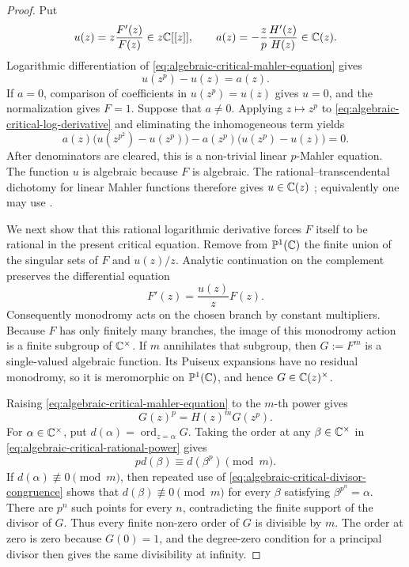 \begin{proof}
Put
\[
 u(z)=z\frac{F'(z)}{F(z)}\in z\mathbb{C}[[z]],
 \qquad
 a(z)=-\frac{z}{p}\frac{H'(z)}{H(z)}\in\mathbb{C}(z).
\]
Logarithmic differentiation of
\eqref{eq:algebraic-critical-mahler-equation} gives
\begin{equation}\label{eq:algebraic-critical-log-derivative}
 u(z^p)-u(z)=a(z).
\end{equation}
If \(a=0\), comparison of coefficients in \(u(z^p)=u(z)\) gives \(u=0\),
and the normalization gives \(F=1\).  Suppose that \(a\ne0\).  Applying
\(z\mapsto z^p\) to
\eqref{eq:algebraic-critical-log-derivative} and eliminating the
inhomogeneous term yields
\begin{equation}\label{eq:algebraic-critical-linear-mahler-equation}
 a(z)\bigl(u(z^{p^2})-u(z^p)\bigr)
 -a(z^p)\bigl(u(z^p)-u(z)\bigr)=0.
\end{equation}
After denominators are cleared, this is a non-trivial linear \(p\)-Mahler
equation.  The function \(u\) is algebraic because \(F\) is algebraic.
The rational--transcendental dichotomy for linear Mahler functions therefore
gives \(u\in\mathbb{C}(z)\)
\cite[Theorem~5.1.7]{Nishioka1996MahlerFunctions}; equivalently one may use
\cite[Corollary~8]{BellCoonsRowland2013MahlerDichotomy}.

We next show that this rational logarithmic derivative forces \(F\) itself
to be rational in the present critical equation.  Remove from
\(\mathbb P^1(\mathbb{C})\) the finite union of the singular sets of \(F\) and
\(u(z)/z\).  Analytic continuation on the complement preserves the
differential equation
\[
 F'(z)=\frac{u(z)}zF(z).
\]
Consequently monodromy acts on the chosen branch by constant multipliers.
Because \(F\) has only finitely many branches, the image of this monodromy
action is a finite subgroup of \(\mathbb{C}^\times\).  If \(m\) annihilates that
subgroup, then \(G:=F^m\) is a single-valued algebraic function.  Its Puiseux
expansions have no residual monodromy, so it is meromorphic on
\(\mathbb P^1(\mathbb{C})\), and hence \(G\in\mathbb{C}(z)^\times\).

Raising \eqref{eq:algebraic-critical-mahler-equation} to the \(m\)-th power
gives
\begin{equation}\label{eq:algebraic-critical-rational-power}
 G(z)^p=H(z)^mG(z^p).
\end{equation}
For \(\alpha\in\mathbb{C}^\times\), put
\(d(\alpha)=\operatorname{ord}_{z=\alpha}G\).  Taking the order at any
\(\beta\in\mathbb{C}^\times\) in
\eqref{eq:algebraic-critical-rational-power} gives
\begin{equation}\label{eq:algebraic-critical-divisor-congruence}
 p d(\beta)\equiv d(\beta^p)\pmod m.
\end{equation}
If \(d(\alpha)\not\equiv0\pmod m\), then repeated use of
\eqref{eq:algebraic-critical-divisor-congruence} shows that
\(d(\beta)\not\equiv0\pmod m\) for every \(\beta\) satisfying
\(\beta^{p^n}=\alpha\).  There are \(p^n\) such points for every \(n\),
contradicting the finite support of the divisor of \(G\).  Thus every finite
non-zero order of \(G\) is divisible by \(m\).  The order at zero is zero
because \(G(0)=1\), and the degree-zero condition for a principal divisor
then gives the same divisibility at infinity.


\end{proof}
